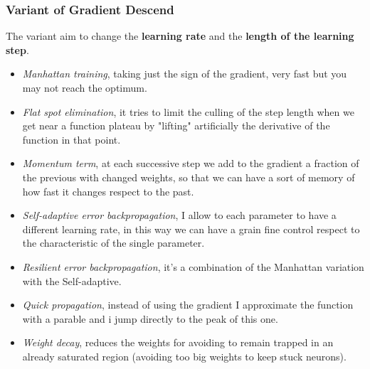 \documentclass{article}
\begin{document}
\subsubsection{Variant of Gradient Descend}
The variant aim to change the \textbf{learning rate} and the \textbf{length of the learning step}.
\begin{itemize}
    \item \textit{Manhattan training}, taking just the sign of the gradient, very fast but you may not reach
          the optimum.

    \item \textit{Flat spot elimination}, it tries to limit the culling of the step length when we get near a
          function plateau by "lifting" artificially the derivative of the function in that point.

    \item \textit{Momentum term}, at each successive step we add to the gradient a fraction of the previous
          with changed weights, so that we can have a sort of memory of how fast it changes respect to the past.

    \item \textit{Self-adaptive error backpropagation}, I allow to each parameter to have a different
          learning rate, in this way we can have a grain fine control respect to the characteristic of the single parameter.

    \item \textit{Resilient error backpropagation}, it's a combination of the Manhattan variation with the Self-adaptive.

    \item \textit{Quick propagation}, instead of using the gradient I approximate the function with a parable and i
          jump directly to the peak of this one.

    \item \textit{Weight decay}, reduces the weights for avoiding to remain trapped in an already saturated region
          (avoiding too big weights to keep stuck neurons).
\end{itemize}
\end{document}
